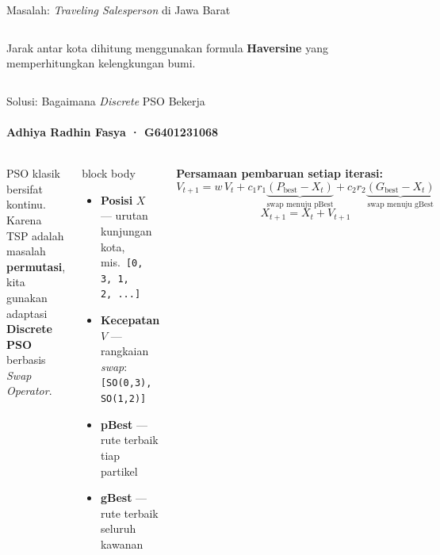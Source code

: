\documentclass[aspectratio=169,10pt]{beamer}
\begin{document}
\begin{frame}{Masalah: \textit{Traveling Salesperson} di Jawa Barat}
\begin{columns}[T,totalwidth=\textwidth]
    \vspace{0.2cm}
    {\footnotesize\color{Slate}
      Jarak antar kota dihitung menggunakan formula \textbf{Haversine}
      yang memperhitungkan kelengkungan bumi.
    }
  \end{columns}
\end{frame}


\begin{frame}{Solusi: Bagaimana \textit{Discrete} PSO Bekerja}
  \framesubtitle{Adhiya Radhin Fasya · G6401231068}
  \begin{columns}[T,totalwidth=\textwidth]
    \small
    PSO klasik bersifat kontinu. Karena TSP adalah masalah
    \textbf{permutasi}, kita gunakan adaptasi \textbf{Discrete PSO}
    berbasis \textit{Swap Operator}.

    \vspace{0.18cm}
    \begin{beamercolorbox}[wd=\linewidth,sep=8pt,rounded=true]{block body}
      \begin{itemize}\small
        \item \textbf{Posisi} $X$ --- urutan kunjungan kota, mis.\ \texttt{[0,\,3,\,1,\,2,\,...]}
        \item \textbf{Kecepatan} $V$ --- rangkaian \textit{swap}: \texttt{[SO(0,3),\,SO(1,2)]}
        \item \textbf{pBest} --- rute terbaik tiap partikel
        \item \textbf{gBest} --- rute terbaik seluruh kawanan
      \end{itemize}
    \end{beamercolorbox}

    \vspace{0.18cm}
    {\small\bfseries Persamaan pembaruan setiap iterasi:}
    \vspace{0.05cm}
    \[
      V_{t+1} = w\,V_t
               + c_1 r_1\!\underbrace{(P_\text{best}-X_t)}_{\text{swap menuju pBest}}
               + c_2 r_2\!\underbrace{(G_\text{best}-X_t)}_{\text{swap menuju gBest}}
    \]
    \[
      X_{t+1} = X_t + V_{t+1}
    \]

    \centering
    \vspace{0.1cm}
\end{columns}
\end{frame}
\end{document}
